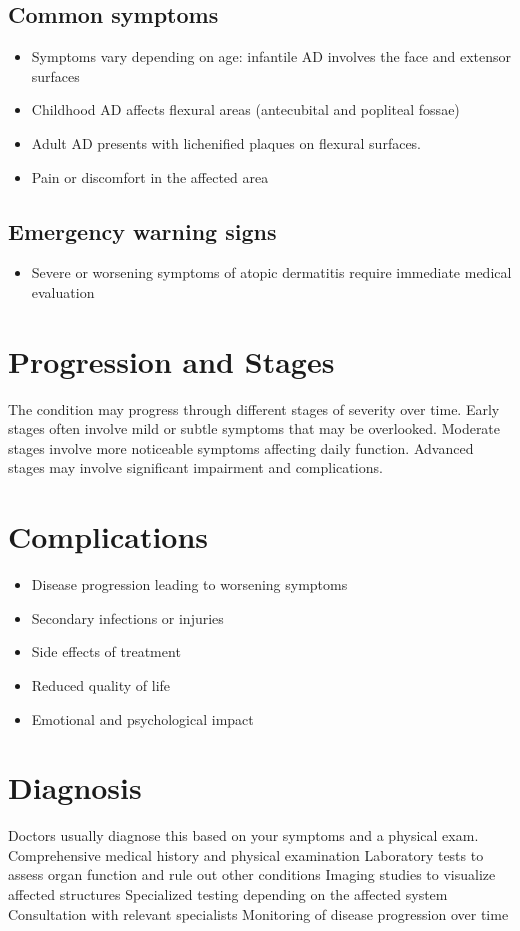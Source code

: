 \subsection{Common symptoms}
\begin{itemize}[noitemsep]
  \item Symptoms vary depending on age: infantile AD involves the face and extensor surfaces
  \item Childhood AD affects flexural areas (antecubital and popliteal fossae)
  \item Adult AD presents with lichenified plaques on flexural surfaces.
  \item Pain or discomfort in the affected area
  \end{itemize}

\subsection{Emergency warning signs}
\begin{itemize}[noitemsep]
  \item Severe or worsening symptoms of atopic dermatitis require immediate medical evaluation
\end{itemize}
\section{Progression and Stages}
The condition may progress through different stages of severity over time. Early stages often involve mild or subtle symptoms that may be overlooked. Moderate stages involve more noticeable symptoms affecting daily function. Advanced stages may involve significant impairment and complications.
\section{Complications}
\begin{itemize}[noitemsep]
  \item Disease progression leading to worsening symptoms
  \item Secondary infections or injuries
  \item Side effects of treatment
  \item Reduced quality of life
  \item Emotional and psychological impact
\end{itemize}
\section{Diagnosis}
Doctors usually diagnose this based on your symptoms and a physical exam. Comprehensive medical history and physical examination Laboratory tests to assess organ function and rule out other conditions Imaging studies to visualize affected structures Specialized testing depending on the affected system Consultation with relevant specialists Monitoring of disease progression over time

